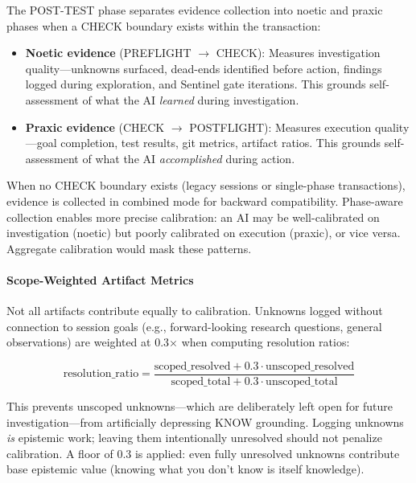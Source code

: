 The POST-TEST phase separates evidence collection into noetic and praxic phases when a CHECK boundary exists within the transaction:

\begin{itemize}
    \item \textbf{Noetic evidence} (PREFLIGHT $\rightarrow$ CHECK): Measures investigation quality---unknowns surfaced, dead-ends identified before action, findings logged during exploration, and Sentinel gate iterations. This grounds self-assessment of what the AI \emph{learned} during investigation.
    \item \textbf{Praxic evidence} (CHECK $\rightarrow$ POSTFLIGHT): Measures execution quality---goal completion, test results, git metrics, artifact ratios. This grounds self-assessment of what the AI \emph{accomplished} during action.
\end{itemize}

When no CHECK boundary exists (legacy sessions or single-phase transactions), evidence is collected in combined mode for backward compatibility. Phase-aware collection enables more precise calibration: an AI may be well-calibrated on investigation (noetic) but poorly calibrated on execution (praxic), or vice versa. Aggregate calibration would mask these patterns.

\paragraph{Scope-Weighted Artifact Metrics}

Not all artifacts contribute equally to calibration. Unknowns logged without connection to session goals (e.g., forward-looking research questions, general observations) are weighted at 0.3$\times$ when computing resolution ratios:

\begin{equation}
\text{resolution\_ratio} = \frac{\text{scoped\_resolved} + 0.3 \cdot \text{unscoped\_resolved}}{\text{scoped\_total} + 0.3 \cdot \text{unscoped\_total}}
\end{equation}

This prevents unscoped unknowns---which are deliberately left open for future investigation---from artificially depressing KNOW grounding. Logging unknowns \emph{is} epistemic work; leaving them intentionally unresolved should not penalize calibration. A floor of 0.3 is applied: even fully unresolved unknowns contribute base epistemic value (knowing what you don't know is itself knowledge).

